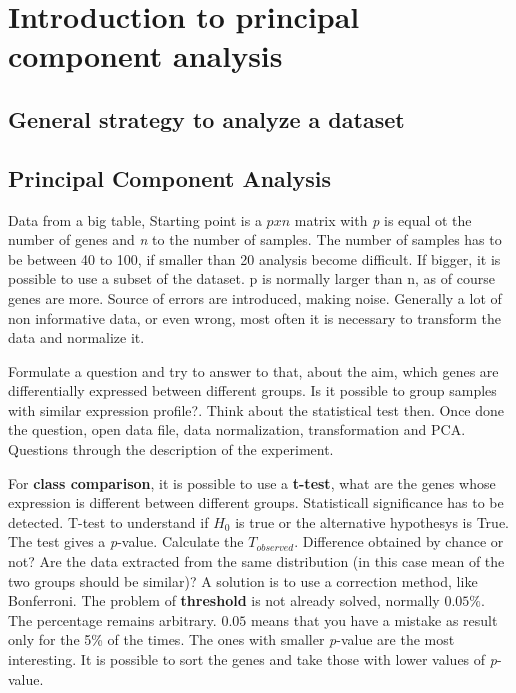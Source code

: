 \graphicspath{{chapters/images/03/}}

\chapter{Introduction to principal component analysis}

	\section{General strategy to analyze a dataset}

	\section{Principal Component Analysis}
	Data from a big table, Starting point is a $ p x n $ matrix with \textit{p} is equal ot the number of genes and \textit{n} to the number of samples. The number of samples has to be between 40 to 100, if smaller than 20 analysis become difficult. If bigger, it is possible to use a subset of the dataset. p is normally larger than n, as of course genes are more. Source of errors are introduced, making noise. Generally a lot of non informative data, or even wrong, most often it is necessary to transform the data and normalize it. 

	Formulate a question and try to answer to that, about the aim, which genes are differentially expressed between different groups. Is it possible to group samples with similar expression profile?. Think about the statistical test then. Once done the question, open data file, data normalization, transformation and PCA. Questions through the description of the experiment. 

	For \textbf{class comparison}, it is possible to use a \textbf{t-test}, what are the genes whose expression is different between different groups. Statisticall significance has to be detected. T-test to understand if $H_0$ is true or the alternative hypothesys is True. The test gives a \textit{p}-value.
	Calculate the $T_{observed}$. Difference obtained by chance or not? Are the data extracted from the same distribution (in this case mean of the two groups should be similar)? 
	A solution is to use a correction method, like Bonferroni. The problem of \textbf{threshold} is not already solved, normally $0.05\%$. The percentage remains arbitrary. $0.05$ means that you have a mistake as result only for the 5\% of the times. 
	The ones with smaller \textit{p}-value are the most interesting. It is possible to sort the genes and take those with lower values of \textit{p}-value.

